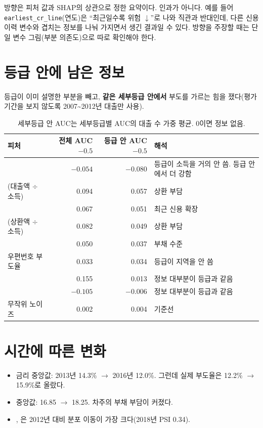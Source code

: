 \begin{warnbox}[SHAP 방향 읽기]
방향은 피처 값과 SHAP의 상관으로 정한 요약이다. 인과가 아니다. 예를 들어 \texttt{earliest\_\allowbreak{}cr\_\allowbreak{}line}(연도)은 ``최근일수록 위험 \ensuremath{\downarrow}''로 나와 직관과 반대인데, 다른 신용 이력 변수와 겹치는 정보를 나눠 가지면서 생긴 결과일 수 있다. 방향을 주장할 때는 단일 변수 그림(부분 의존도)으로 따로 확인해야 한다.
\end{warnbox}

\section{등급 안에 남은 정보}
등급이 이미 설명한 부분을 빼고, \textbf{같은 세부등급 안에서} 부도를 가르는 힘을 쟀다(평가 기간을 보지 않도록 2007\textasciitilde 2012년 대출만 사용).

\begin{table}[H]\centering\small
\begin{tabularx}{\linewidth}{@{}lrrL@{}}\toprule
피처 & 전체 AUC$-0.5$ & 등급 안 AUC$-0.5$ & 해석\\\midrule
{} & $-0.054$ & $-0.080$ & 등급이 소득을 거의 안 씀. 등급 안에서 더 강함\\
(대출액 \ensuremath{\div} 소득) & 0.094 & 0.057 & 상환 부담\\
 & 0.067 & 0.051 & 최근 신용 확장\\
(상환액 \ensuremath{\div} 소득) & 0.082 & 0.049 & 상환 부담\\
 & 0.050 & 0.037 & 부채 수준\\
우편번호 부도율 & 0.033 & 0.034 & 등급이 지역을 안 씀\\
 & 0.155 & 0.013 & 정보 대부분이 등급과 같음\\
 & $-0.105$ & $-0.006$ & 정보 대부분이 등급과 같음\\
무작위 노이즈 & 0.002 & 0.004 & 기준선\\\bottomrule
\end{tabularx}
\caption{세부등급 안 AUC는 세부등급별 AUC의 대출 수 가중 평균. 0이면 정보 없음.}
\end{table}

\section{시간에 따른 변화}
\begin{itemize}
\item 금리 중앙값: 2013년 14.3\% \ensuremath{\to} 2016년 12.0\%. 그런데 실제 부도율은 12.2\% \ensuremath{\to} 15.9\%로 올랐다.
\item {} 중앙값: 16.85 \ensuremath{\to} 18.25. 차주의 부채 부담이 커졌다.
\item {}, 은 2012년 대비 분포 이동이 가장 크다(2018년 PSI 0.34).
\end{itemize}

